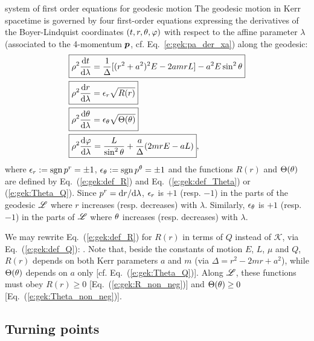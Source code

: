 \begin{tprop}{system of first order equations for geodesic motion}{}
The geodesic motion in Kerr spacetime is
governed by four first-order equations expressing the derivatives of
the Boyer-Lindquist coordinates $(t,r,\theta,\varphi)$ with respect to the affine
parameter $\lambda$ (associated to the 4-momentum $\bm{p}$, cf. Eq.~\eqref{e:gek:pa_der_xa}) along the geodesic:
\begin{subequations}
\label{e:gek:eom_first_order}
\begin{align}
& \fbox{$\displaystyle  \rho^2 \frac{\mathrm{d} t}{\mathrm{d} \lambda} = \frac{1}{\Delta} [(r^2 + a^2)^2 E - 2a m r L] - a^2 E \sin^2\theta  $} \label{e:gek:dtdl} \\
& \fbox{$\displaystyle  \rho^2 \frac{\mathrm{d} r}{\mathrm{d} \lambda} = \epsilon_r \sqrt{ R(r) } $} \label{e:gek:drdl}\\
& \fbox{$\displaystyle  \rho^2 \frac{\mathrm{d} \theta}{\mathrm{d} \lambda} = \epsilon_\theta \sqrt{\Theta(\theta)} $} \label{e:gek:dthdl}\\
& \fbox{$\displaystyle  \rho^2 \frac{\mathrm{d} \varphi}{\mathrm{d} \lambda}  = \frac{L}{\sin^2\theta}
    + \frac{a}{\Delta}(2 m r E - a L) $} , \label{e:gek:dphdl}
\end{align}
\end{subequations}
where $\epsilon_r := \operatorname{sgn} p^r = \pm 1$,  $\epsilon_\theta := \operatorname{sgn} p^\theta = \pm 1$
and the functions $R(r)$ and $\Theta(\theta)$ are defined by Eq.~(\ref{e:gek:def_R})
and Eq.~(\ref{e:gek:def_Theta}) or (\ref{e:gek:Theta_Q}).
Since $p^r = \mathrm{d} r/\mathrm{d}\lambda$,  $\epsilon_r$
is $+1$ (resp. $-1$) in the parts of the geodesic $\mathscr{L}$ where $r$ increases
(resp. decreases) with $\lambda$. Similarly, $\epsilon_\theta$
is $+1$ (resp. $-1$) in the parts of $\mathscr{L}$ where $\theta$ increases
(resp. decreases) with $\lambda$.
\end{tprop}

We may rewrite Eq.~(\ref{e:gek:def_R}) for $R(r)$ in terms of $Q$
instead of $\mathscr{K}$, via Eq.~(\ref{e:gek:def_Q}):
\be \label{e:gek:def_R_Q}
   .
\ee
Note that, beside the constants of motion $E$, $L$, $\mu$ and $Q$, $R(r)$ depends on both Kerr parameters $a$ and $m$
(via $\Delta = r^2 - 2 m r + a^2$), while $\Theta(\theta)$
depends on $a$ only [cf. Eq.~(\ref{e:gek:Theta_Q})].
Along $\mathscr{L}$, these functions must obey
$R(r) \geq 0$ [Eq.~(\ref{e:gek:R_non_neg})] and $\Theta(\theta) \geq 0$
[Eq.~(\ref{e:gek:Theta_non_neg})].


\subsection{Turning points} \label{s:gek:turning_points}

